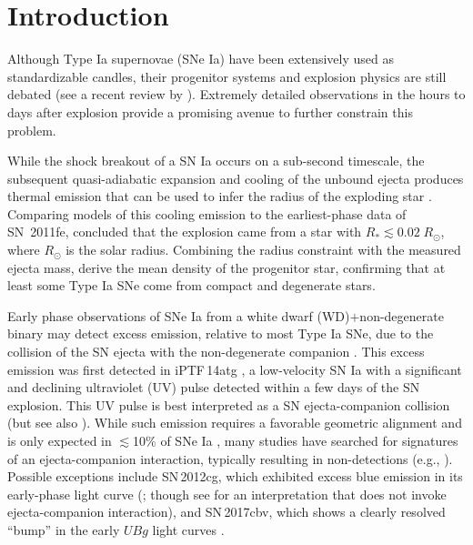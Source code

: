 \documentclass[twocolumn]{aastex61}
\newcommand{\sr}{R_\odot}
\newcommand{\ycao}[1]{{\color{red} ycao: {#1}}}
\begin{document}

\section{Introduction}
\label{sec:intro}

Although Type Ia supernovae (SNe Ia) have been extensively used as
standardizable candles, their progenitor systems and explosion physics are
still debated (see a recent review by \citealt{2014ARA&A..52..107M}).
Extremely detailed observations in the hours to days after explosion provide a
promising avenue to further constrain this problem.

While the shock breakout of a SN Ia occurs on a sub-second timescale, the
subsequent quasi-adiabatic expansion and cooling of the unbound ejecta
produces thermal emission that can be used to infer the radius of the
exploding star \citep{2010ApJ...708..598P,2011ApJ...728...63R}. Comparing
models of this cooling emission to the earliest-phase data of SN~2011fe,
\citet{2012ApJ...744L..17B} concluded that the explosion came from a star with
$R_\ast \lesssim 0.02\;\sr$, where $\sr$ is the solar radius. Combining the
radius constraint with the measured ejecta mass,
\citeauthor{2012ApJ...744L..17B} derive the mean density of the progenitor
star, confirming that at least some Type Ia SNe come from compact and
degenerate stars.

Early phase observations of SNe Ia from a white dwarf (WD)$+$non-degenerate
binary may detect excess emission, relative to most Type Ia SNe, due to the
collision of the SN ejecta with the non-degenerate companion
\citep{1973ApJ...186.1007W,2010ApJ...708.1025K}. This excess emission was
first detected in iPTF\,14atg \citep{2015Natur.521..328C}, a low-velocity SN
Ia with a significant and declining ultraviolet (UV) pulse detected within a
few days of the SN explosion. This UV pulse is best interpreted as a SN
ejecta-companion collision (but see also
\citealt{2016MNRAS.459.4428K,2017MNRAS.472.2787N}). While such emission
requires a favorable geometric alignment and is only expected in
$\lesssim$10\% of SNe Ia \citep{2010ApJ...708.1025K}, many studies have
searched for signatures of an ejecta-companion interaction, typically
resulting in non-detections (e.g.,
\citealt{2010ApJ...722.1691H,2011ApJ...741...20B,2012ApJ...744...38F,
2012ApJ...744L..17B,2015Natur.521..332O,
2013ApJ...778L..15Z,2015ApJ...799..106G,2016ApJ...826..144S,
2015ApJS..221...22I}). Possible exceptions include SN\,2012cg, which exhibited
excess blue emission in its early-phase light curve
(\citealt{2016ApJ...820...92M}; though see \citealt{2016arXiv161007601S} for
an interpretation that does not invoke ejecta-companion interaction), and
SN\,2017cbv, which shows a clearly resolved ``bump'' in the early $UBg$ light
curves \citep{2017ApJ...845L..11H}.
\end{document}
